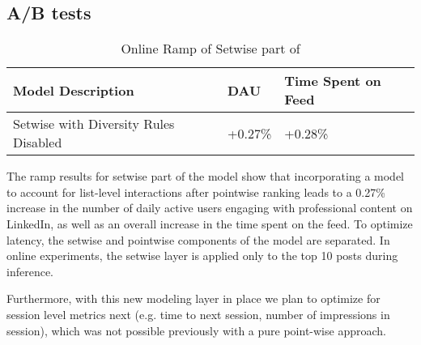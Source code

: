 \subsection{A/B tests}


\begin{table}[h!]
\centering
\small
\begin{tabular}{lll} %
\toprule
Model Description & DAU & Time Spent on Feed \\ %
\midrule
Setwise with Diversity Rules Disabled & +0.27\%  & +0.28\% \\
\bottomrule
\end{tabular}
\caption{Online Ramp of Setwise part of {\systemname}}
\label{tab:example_table}
\vspace{-2.0em}
\end{table}
The ramp results for setwise part of the model show that incorporating a model to account for list-level interactions after pointwise ranking leads to a 0.27\% increase in the number of daily active users engaging with professional content on LinkedIn, as well as an overall increase in the time spent on the feed. To optimize latency, the setwise and pointwise components of the model are separated. In online experiments, the setwise layer is applied only to the top 10 posts during inference.

Furthermore, with this new modeling layer in place we plan to optimize for session level metrics next  (e.g. time to next session, number of impressions in session), which was not possible previously with a pure point-wise approach.

